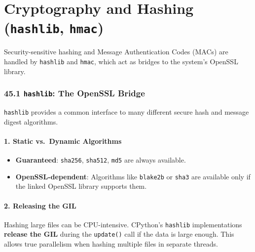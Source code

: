 \hypertarget{cryptography-and-hashing-hashlib-hmac}{%
\chapter{\texorpdfstring{Cryptography and Hashing (\texttt{hashlib},
\texttt{hmac})}{Cryptography and Hashing (hashlib, hmac)}}\label{cryptography-and-hashing-hashlib-hmac}}

Security-sensitive hashing and Message Authentication Codes (MACs) are
handled by \passthrough{\lstinline!hashlib!} and
\passthrough{\lstinline!hmac!}, which act as bridges to the system's
OpenSSL library.

\hypertarget{hashlib-the-openssl-bridge}{%
\subsection{\texorpdfstring{45.1 \texttt{hashlib}: The OpenSSL
Bridge}{45.1 hashlib: The OpenSSL Bridge}}\label{hashlib-the-openssl-bridge}}

\passthrough{\lstinline!hashlib!} provides a common interface to many
different secure hash and message digest algorithms.

\hypertarget{static-vs.-dynamic-algorithms}{%
\subsubsection{1. Static vs.~Dynamic
Algorithms}\label{static-vs.-dynamic-algorithms}}

\begin{itemize}
\tightlist
\item
  \textbf{Guaranteed}: \passthrough{\lstinline!sha256!},
  \passthrough{\lstinline!sha512!}, \passthrough{\lstinline!md5!} are
  always available.
\item
  \textbf{OpenSSL-dependent}: Algorithms like
  \passthrough{\lstinline!blake2b!} or \passthrough{\lstinline!sha3!}
  are available only if the linked OpenSSL library supports them.
\end{itemize}

\hypertarget{releasing-the-gil}{%
\subsubsection{2. Releasing the GIL}\label{releasing-the-gil}}

Hashing large files can be CPU-intensive. CPython's
\passthrough{\lstinline!hashlib!} implementations \textbf{release the
GIL} during the \passthrough{\lstinline!update()!} call if the data is
large enough. This allows true parallelism when hashing multiple files
in separate threads.

